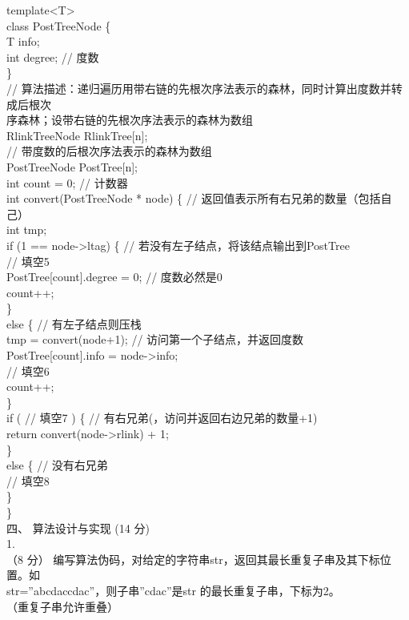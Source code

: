 \begin{question}
template<T>\\
class PostTreeNode \{\\
T info;\\
int degree;              // 度数\\
\}\\
// 算法描述：递归遍历用带右链的先根次序法表示的森林，同时计算出度数并转成后根次\\
序森林；设带右链的先根次序法表示的森林为数组\\
RlinkTreeNode RlinkTree[n];\\
// 带度数的后根次序法表示的森林为数组\\
PostTreeNode PostTree[n];\\
int count = 0;                      // 计数器\\
int convert(PostTreeNode * node) \{ // 返回值表示所有右兄弟的数量（包括自己）\\
int tmp;\\
if (1 == node->ltag) \{           // 若没有左子结点，将该结点输出到PostTree\\
// 填空5\\
PostTree[count].degree = 0; // 度数必然是0\\
count++;\\
\}\\
else \{                        // 有左子结点则压栈\\
tmp = convert(node+1);     // 访问第一个子结点，并返回度数\\
PostTree[count].info = node->info;\\
// 填空6\\
count++;\\
\}\\
if (       // 填空7         ) \{  // 有右兄弟(，访问并返回右边兄弟的数量+1)\\
return convert(node->rlink) + 1;\\
\}\\
else \{                       // 没有右兄弟\\
// 填空8\\
\}\\
\}\\
四、 算法设计与实现 (14 分)\\
1.\\
（8 分） 编写算法伪码，对给定的字符串str，返回其最长重复子串及其下标位置。如\\
str=”abcdaccdac”，则子串”cdac”是str 的最长重复子串，下标为2。\\
（重复子串允许重叠）\\

\end{question}
